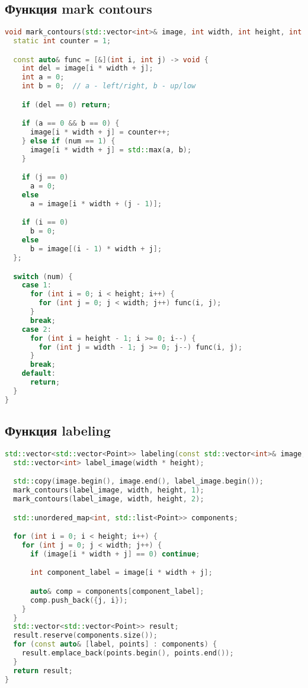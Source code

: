 \documentclass[12pt]{article}
\begin{document}
\subsection*{Функция mark contours}

\begin{lstlisting}[language=C++]
void mark_contours(std::vector<int>& image, int width, int height, int num) {
  static int counter = 1;

  const auto& func = [&](int i, int j) -> void {
    int del = image[i * width + j];
    int a = 0;
    int b = 0;  // a - left/right, b - up/low

    if (del == 0) return;

    if (a == 0 && b == 0) {
      image[i * width + j] = counter++;
    } else if (num == 1) {
      image[i * width + j] = std::max(a, b);
    }

    if (j == 0)
      a = 0;
    else
      a = image[i * width + (j - 1)];

    if (i == 0)
      b = 0;
    else
      b = image[(i - 1) * width + j];
  };

  switch (num) {
    case 1:
      for (int i = 0; i < height; i++) {
        for (int j = 0; j < width; j++) func(i, j);
      }
      break;
    case 2:
      for (int i = height - 1; i >= 0; i--) {
        for (int j = width - 1; j >= 0; j--) func(i, j);
      }
      break;
    default:
      return;
  }
}
\end{lstlisting}
\subsection*{Функция labeling}

\begin{lstlisting}[language=C++]
std::vector<std::vector<Point>> labeling(const std::vector<int>& image, int width, int height) {
  std::vector<int> label_image(width * height);

  std::copy(image.begin(), image.end(), label_image.begin());
  mark_contours(label_image, width, height, 1);
  mark_contours(label_image, width, height, 2);

  std::unordered_map<int, std::list<Point>> components;

  for (int i = 0; i < height; i++) {
    for (int j = 0; j < width; j++) {
      if (image[i * width + j] == 0) continue;

      int component_label = image[i * width + j];

      auto& comp = components[component_label];
      comp.push_back({j, i});
    }
  }
  std::vector<std::vector<Point>> result;
  result.reserve(components.size());
  for (const auto& [label, points] : components) {
    result.emplace_back(points.begin(), points.end());
  }
  return result;
}
\end{lstlisting}
\end{document}
